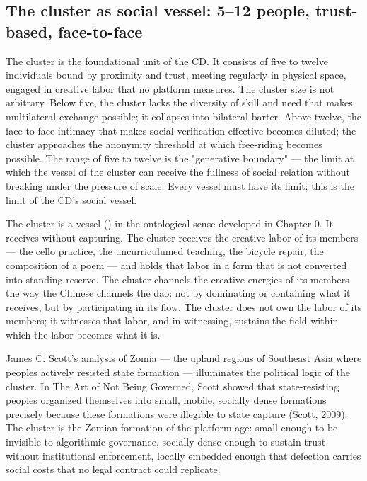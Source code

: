 \subsection{The cluster as social vessel: 5–12 people, trust-based, face-to-face}

The cluster is the foundational unit of the CD. It consists of five to twelve individuals bound by proximity and trust, meeting regularly in physical space, engaged in creative labor that no platform measures. The cluster size is not arbitrary. Below five, the cluster lacks the diversity of skill and need that makes multilateral exchange possible; it collapses into bilateral barter. Above twelve, the face-to-face intimacy that makes social verification effective becomes diluted; the cluster approaches the anonymity threshold at which free-riding becomes possible. The range of five to twelve is the "generative boundary" — the limit at which the vessel of the cluster can receive the fullness of social relation without breaking under the pressure of scale. Every vessel must have its limit; this is the limit of the CD's social vessel.

The cluster is a vessel () in the ontological sense developed in Chapter 0. It receives without capturing. The cluster receives the creative labor of its members — the cello practice, the uncurriculumed teaching, the bicycle repair, the composition of a poem — and holds that labor in a form that is not converted into standing-reserve. The cluster channels the creative energies of its members the way the Chinese  channels the dao: not by dominating or containing what it receives, but by participating in its flow. The cluster does not own the labor of its members; it witnesses that labor, and in witnessing, sustains the field within which the labor becomes what it is.

James C. Scott's analysis of Zomia — the upland regions of Southeast Asia where peoples actively resisted state formation — illuminates the political logic of the cluster. In The Art of Not Being Governed, Scott showed that state-resisting peoples organized themselves into small, mobile, socially dense formations precisely because these formations were illegible to state capture (Scott, 2009). The cluster is the Zomian formation of the platform age: small enough to be invisible to algorithmic governance, socially dense enough to sustain trust without institutional enforcement, locally embedded enough that defection carries social costs that no legal contract could replicate.

